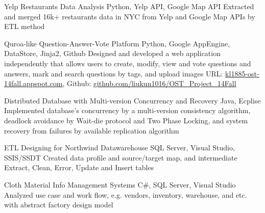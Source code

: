 \documentclass[11pt,a4paper,sans]{moderncv}   %
\begin{document}
{Yelp Restaurants Data Analysis}
{Python, Yelp API, Google Map API}
{}{}
{
{Extracted and merged 16k+ restaurants data in NYC from Yelp and Google Map APIs by ETL method}
}

{Quroa-like Question-Answer-Vote Platform}
{Python, Google AppEngine, DataStore, Jinja2, Github}
{}{}
{
{Designed and developed a web application independently that allows users to create, modify, view and vote questions and answers, mark and search questions by tags, and upload images}
\newline
{
{URL: {\href{http://kl1885-ost-14fall.appspot.com/}{kl1885-ost-14fall.appspot.com}}},
{Github: {\href{http://github.com/liukun1016/OST_Project_14Fall/}{github.com/liukun1016/OST\_Project\_14Fall}}}
}
}


{Distributed Database with Multi-version Concurrency and Recovery}
{Java, Ecplise}
{}{}
{{Implemented database’s concurrency by a multi-version consistency algorithm, deadlock avoidance by Wait-die protocol and Two Phase Locking, and system recovery from failures by available replication algorithm}
}

{ETL Designing for Northwind Datawarehouse}
{SQL Server, Visual Studio, SSIS/SSDT}
{}{}
{{Created data profile and source/target map, and intermediate Extract, Clean, Error, Update and Insert tables}
}

{Cloth Material Info Management Systems}
{C\#, SQL Server, Visual Studio}
{}{}
{{Analyzed use case and work flow, e.g. vendors, inventory, warehouse, and etc. with abstract factory design model}
}
\end{document}
